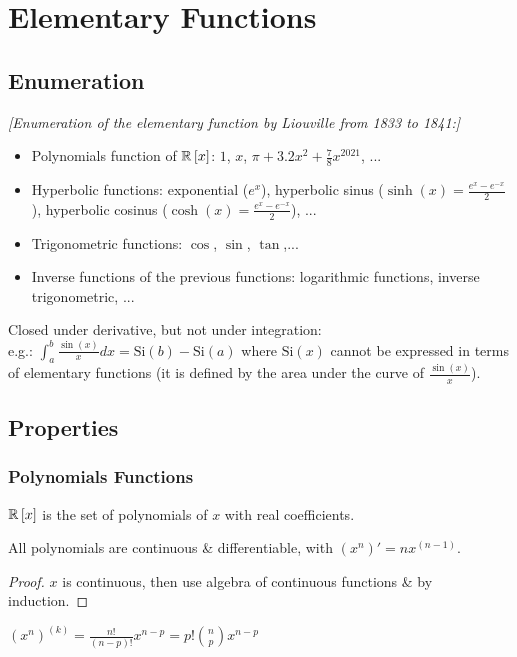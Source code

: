 \chapter{Elementary Functions}

\section{Enumeration}
\textit{[Enumeration of the elementary function by Liouville from
1833 to 1841:]}

\begin{itemize}
	\item Polynomials function of $\mathbb{R}\left[ x \right]$: $1$, $x$, $\pi + 3.2x^2+ \frac{7}{8}x^{2021}$, ...
	\item Hyperbolic functions: exponential ($e^x$), hyperbolic sinus ($\sinh(x) = \frac{e^x - e^{-x}}{2}$), hyperbolic cosinus ($\cosh(x) = \frac{e^x - e^{-x}}{2}$), ...
	\item Trigonometric functions: $\cos$, $\sin$, $\tan$,...
	\item Inverse functions of the previous functions: logarithmic functions, inverse
	trigonometric, ...
\end{itemize}

Closed under derivative, but not under integration:\\
e.g.: $\int_{a}^{b} \frac{\sin(x)}{x}dx = \text{Si}(b) - \text{Si}(a)$ where $\text{Si}(x)$ cannot be expressed in terms of elementary functions (it is defined by the area under the curve of $\frac{\sin(x)}{x}$).

\section{Properties}
\subsection{Polynomials Functions}
\begin{definition}
	$\mathbb{R} \left[ x \right]$ is the set of polynomials of $x$ with real coefficients.
\end{definition}
\begin{property}
	All polynomials are continuous \& differentiable, with $(x^n)' = nx^{(n-1)}$.
\end{property}
\begin{proof}
	$x$ is continuous, then use algebra of continuous functions \& by induction.
\end{proof}
\begin{corollary}
	$\left( x^n \right)^{(k)} = \frac{n!}{(n-p)!}x^{n-p} = p! \binom{n}{p} x^{n-p}$
\end{corollary}

